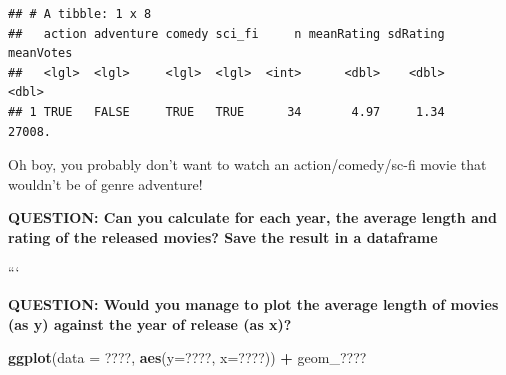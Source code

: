 \documentclass[]{book}
\newenvironment{Shaded}{\begin{snugshade}}{\end{snugshade}}
\newcommand{\DataTypeTok}[1]{\textcolor[rgb]{0.13,0.29,0.53}{#1}}
\newcommand{\DecValTok}[1]{\textcolor[rgb]{0.00,0.00,0.81}{#1}}
\newcommand{\KeywordTok}[1]{\textcolor[rgb]{0.13,0.29,0.53}{\textbf{#1}}}
\newcommand{\NormalTok}[1]{#1}
\newcommand{\OperatorTok}[1]{\textcolor[rgb]{0.81,0.36,0.00}{\textbf{#1}}}
\newcommand{\StringTok}[1]{\textcolor[rgb]{0.31,0.60,0.02}{#1}}
\begin{document}
\begin{Shaded}
\end{Shaded}

\begin{verbatim}
## # A tibble: 1 x 8
##   action adventure comedy sci_fi     n meanRating sdRating meanVotes
##   <lgl>  <lgl>     <lgl>  <lgl>  <int>      <dbl>    <dbl>     <dbl>
## 1 TRUE   FALSE     TRUE   TRUE      34       4.97     1.34    27008.
\end{verbatim}

Oh boy, you probably don't want to watch an action/comedy/sc-fi movie that wouldn't be of genre adventure!

\textbf{QUESTION: Can you calculate for each year, the average length and rating of the released movies? Save the result in a dataframe}

\begin{Shaded}
\end{Shaded}

```

\textbf{QUESTION: Would you manage to plot the average length of movies (as y) against the year of release (as x)?}

\begin{Shaded}
\begin{Highlighting}[]
\KeywordTok{ggplot}\NormalTok{(}\DataTypeTok{data =}\NormalTok{ ????, }\KeywordTok{aes}\NormalTok{(}\DataTypeTok{y=}\NormalTok{????, }\DataTypeTok{x=}\NormalTok{????)) }\OperatorTok{+}\StringTok{ }
\StringTok{  }\NormalTok{geom_????}
\end{Highlighting}
\end{Shaded}
\end{document}
